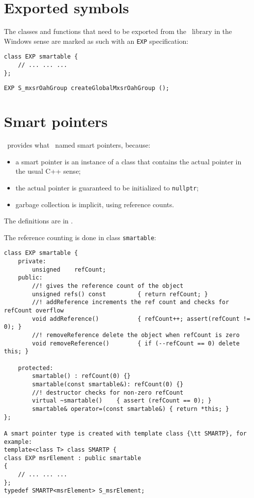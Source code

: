 \section{Exported symbols}

The classes and functions that need to be exported from the \mf\ library in the Windows sense are marked as such with an {\tt EXP} specification:
\begin{lstlisting}[language=CPlusPlus]
class EXP smartable {
	// ... ... ...
};
\end{lstlisting}

\begin{lstlisting}[language=CPlusPlus]
EXP S_mxsrOahGroup createGlobalMxsrOahGroup ();
\end{lstlisting}


\section{Smart pointers}

\libmusicxml\ provides what \fober\ named smart pointers, because:
\begin{itemize}
\item a smart pointer is an instance of a class that contains the actual pointer in the usual C++ sense;
\item the actual pointer is guaranteed to be initialized to {\tt nullptr};
\item garbage collection is implicit, using reference counts.
\end{itemize}
The definitions are in .

The reference counting is done in class {\tt smartable}:
\begin{lstlisting}[language=CPlusPlus]
class EXP smartable {
	private:
		unsigned 	refCount;
	public:
		//! gives the reference count of the object
		unsigned refs() const         { return refCount; }
		//! addReference increments the ref count and checks for refCount overflow
		void addReference()           { refCount++; assert(refCount != 0); }
		//! removeReference delete the object when refCount is zero
		void removeReference()		  { if (--refCount == 0) delete this; }

	protected:
		smartable() : refCount(0) {}
		smartable(const smartable&): refCount(0) {}
		//! destructor checks for non-zero refCount
		virtual ~smartable()    { assert (refCount == 0); }
		smartable& operator=(const smartable&) { return *this; }
};

A smart pointer type is created with template class {\tt SMARTP}, for example:
template<class T> class SMARTP {
class EXP msrElement : public smartable
{
	// ... ... ...
};
typedef SMARTP<msrElement> S_msrElement;

\end{lstlisting}

